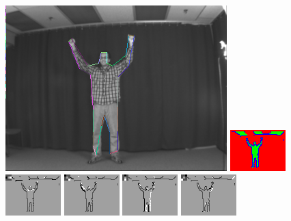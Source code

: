 \begin{figure}

\includegraphics[width=0.48 \linewidth]{output/2.detection/local_inference/out.s1.0070.d/thefinalparse.png}
\includegraphics[width=0.48 \linewidth]{output/2.detection/local_inference/out.s1.0070.d/local.x5.interior.png}
\includegraphics[width=0.24 \linewidth]{output/2.detection/local_inference/out.s1.0070.d/local.x5.orientations.0.png}
\includegraphics[width=0.24 \linewidth]{output/2.detection/local_inference/out.s1.0070.d/local.x5.orientations.1.png}
\includegraphics[width=0.24 \linewidth]{output/2.detection/local_inference/out.s1.0070.d/local.x5.orientations.2.png}
\includegraphics[width=0.24 \linewidth]{output/2.detection/local_inference/out.s1.0070.d/local.x5.orientations.3.png}


\end{figure}
